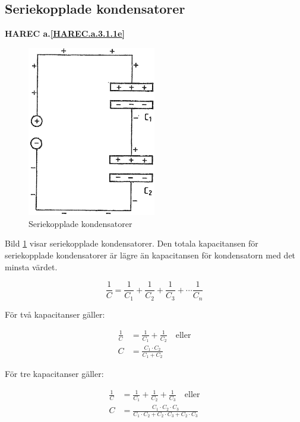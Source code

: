\subsection{Seriekopplade kondensatorer}
\textbf{HAREC a.\ref{HAREC.a.3.1.1e}\label{myHAREC.a.3.1.1e}}

\begin{figure}[ht]
\begin{center}
  \includegraphics[width=0.5\textwidth]{images/cropped_pdfs/bild_2_3-06.pdf}
  \caption{Seriekopplade kondensatorer}
  \label{fig:BildII3-06}
\end{center}
\end{figure}

Bild \ref{fig:BildII3-06} visar seriekopplade kondensatorer.
Den totala kapacitansen för seriekopplade kondensatorer är lägre än kapacitansen
för kondensatorn med det minsta värdet.

\[
\frac{1}{C} = \frac{1}{C_1} + \frac{1}{C_2} +
\frac{1}{C_3} + \cdots \frac{1}{C_n}
\]

För två kapacitanser gäller:

\begin{align*}
  \frac{1}{C} &= \frac{1}{C_1} + \frac{1}{C_2} \quad \text{eller} \\
  C &= \frac{C_1 \cdot C_2}{C_1 + C_2}
\end{align*}

För tre kapacitanser gäller:

\begin{align*}
  \frac{1}{C} &= \frac{1}{C_1} + \frac{1}{C_2} + \frac{1}{C_3}
  \quad \text{eller} \\
  C &= \frac{C_1 \cdot C_2 \cdot C_3}
  {C_1 \cdot C_2 + C_2 \cdot C_3 + C_2 \cdot C_3}
\end{align*}

